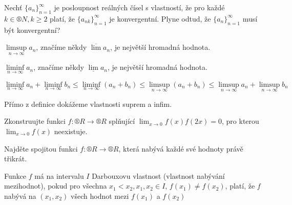 \documentclass[12pt]{article}					%
\begin{document}
    \begin{priklad}
        Nechť $\{a_n\}_{n = 1}^∞$ je posloupnost reálných čísel s vlastností, že pro každé $k \in ®N, k≥2$ platí, že $\{a_{nk}\}_{n = 1}^∞$ je konvergentní. Plyne odtud, že $\{a_n\}_{n = 1}^∞$ musí být konvergentní?
    \end{priklad}

    \begin{poznamka}[Připomeňme]
        $\limsup\limits_{n \rightarrow ∞} a_n$, značíme někdy $\overline{\lim} a_n$, je největší hromadná hodnota.

        $\liminf\limits_{n \rightarrow ∞} a_n$, značíme někdy $\underline{\lim} a_n$, je největší hromadná hodnota.
    \end{poznamka}

    \begin{tvrzeni}
        $$ \liminf\limits_{n \rightarrow ∞} a_n + \liminf\limits_{n \rightarrow ∞}b_n ≤ \liminf\limits_{n \rightarrow ∞} (a_n + b_n) ≤ \limsup\limits_{n \rightarrow ∞} (a_n + b_n) ≤ \limsup\limits_{n \rightarrow ∞} a_n + \limsup\limits_{n \rightarrow ∞} b_n $$
        \begin{dukazin}
            Přímo z definice dokážeme vlastnosti suprem a infim.
        \end{dukazin}
    \end{tvrzeni}


    \begin{priklad}
            Zkonstruujte funkci $f: ®R \rightarrow ®R$ splňující $\lim_{x \rightarrow 0} f(x)f(2x) = 0$, pro kterou $\lim_{x \rightarrow 0} f(x)$ neexistuje.
    \end{priklad}


    \begin{priklad}
        Najděte spojitou funkci $f: ®R \rightarrow ®R$, která nabývá každé své hodnoty právě třikrát.
    \end{priklad}

    \begin{definice}
        Funkce $f$ má na intervalu $I$ Darbouxovu vlastnost (vlastnost nabývání mezihodnot), pokud pro všechna $x_1 < x_2, x_1, x_2 \in I$, $f(x_1) ≠ f(x_2)$, platí, že $f$ nabývá na $(x_1, x_2)$ všech hodnot mezi $f(x_1)$ a $f(x_2)$
    \end{definice}
\end{document}
